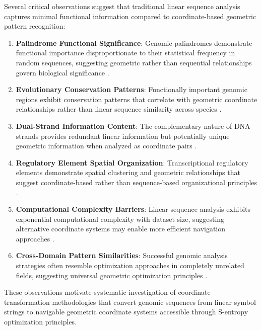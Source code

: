 \documentclass[12pt,a4paper]{article}
\begin{document}
Several critical observations suggest that traditional linear sequence analysis captures minimal functional information compared to coordinate-based geometric pattern recognition:

\begin{enumerate}
\item \textbf{Palindrome Functional Significance}: Genomic palindromes demonstrate functional importance disproportionate to their statistical frequency in random sequences, suggesting geometric rather than sequential relationships govern biological significance \cite{encode2012integrated}.

\item \textbf{Evolutionary Conservation Patterns}: Functionally important genomic regions exhibit conservation patterns that correlate with geometric coordinate relationships rather than linear sequence similarity across species \cite{siepel2005evolutionarily}.

\item \textbf{Dual-Strand Information Content}: The complementary nature of DNA strands provides redundant linear information but potentially unique geometric information when analyzed as coordinate pairs \cite{watson1953molecular}.

\item \textbf{Regulatory Element Spatial Organization}: Transcriptional regulatory elements demonstrate spatial clustering and geometric relationships that suggest coordinate-based rather than sequence-based organizational principles \cite{spitz2012regulatory}.

\item \textbf{Computational Complexity Barriers}: Linear sequence analysis exhibits exponential computational complexity with dataset size, suggesting alternative coordinate systems may enable more efficient navigation approaches \cite{pop2009genome}.

\item \textbf{Cross-Domain Pattern Similarities}: Successful genomic analysis strategies often resemble optimization approaches in completely unrelated fields, suggesting universal geometric optimization principles \cite{bialek2012biophysics}.
\end{enumerate}

These observations motivate systematic investigation of coordinate transformation methodologies that convert genomic sequences from linear symbol strings to navigable geometric coordinate systems accessible through S-entropy optimization principles.
\end{document}
